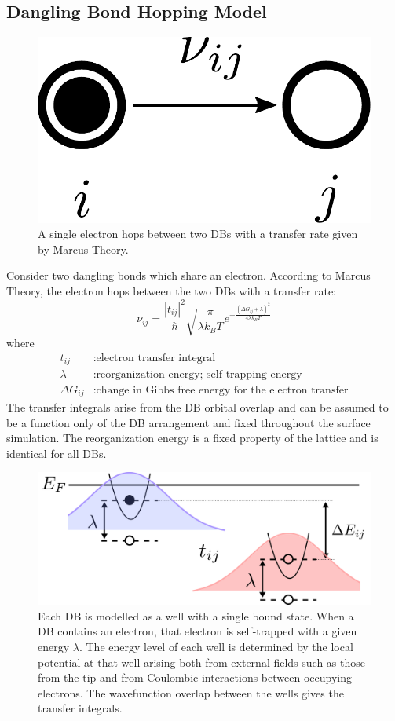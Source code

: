 \documentclass[11pt]{article}
\newcommand{\kt}{k_B T}
\begin{document}
\subsection{Dangling Bond Hopping Model}
%
\begin{figure}[h!]
\centering
 \includegraphics[width=.2\textwidth]{2db-nu}
 \caption{A single electron hops between two DBs with a transfer rate given by Marcus Theory.}
 \label{fig:2db-nu}
\end{figure}
%
Consider two dangling bonds which share an electron. According to Marcus Theory, the electron hops between the two DBs with a transfer rate:
\begin{equation}
\nu_{ij} = \frac{|t_{ij}|^2}{\hbar} \sqrt{\frac{\pi}{\lambda k_B T}} e^{-\frac{(\Delta G_{ij} + \lambda)^2}{4\lambda \kt}}
\end{equation}
where
\begin{align*}
t_{ij} &: \text{electron transfer integral}\\
\lambda &: \text{reorganization energy; self-trapping energy}\\
\Delta G_{ij} &: \text{change in Gibbs free energy for the electron transfer}
\end{align*}
The transfer integrals arise from the DB orbital overlap and can be assumed to be a function only of the DB arrangement and fixed throughout the surface simulation. The reorganization energy is a fixed property of the lattice and is identical for all DBs.
\begin{figure}
\centering
 \includegraphics[width=.7\textwidth]{2db-landscape}
 \caption{Each DB is modelled as a well with a single bound state. When a DB contains an electron, that electron is self-trapped with a given energy $\lambda$. The energy level of each well is determined by the local potential at that well arising both from external fields such as those from the tip and from Coulombic interactions between occupying electrons. The wavefunction overlap between the wells gives the transfer integrals.}
 \label{fig:2db-landscape}
\end{figure}
\end{document}
